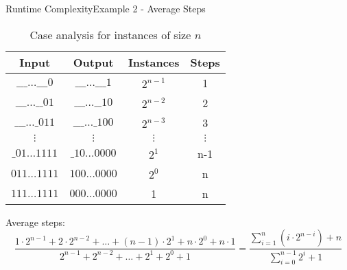 \begin{frame}{Runtime Complexity}{Example 2 - Average Steps}
  \vspace{-2.0em}
  \begin{table}[!h]%
    \caption{Case analysis for instances of size $n$}%
    \label{tab:runtime:binary_addition_case_analysis}%
    \vspace{-0.5em}%
    \begin{tabular}{cccc}
      Input & Output & Instances & Steps\\
      \midrule
      $\_\_\_ \ldots \_\_\_0$ & $\_\_\_ \ldots \_\_\_1$ &$2^{n-1}$ & 1\\
      $\_\_\_ \ldots \_\_01$ & $\_\_\_ \ldots \_\_10$ & $2^{n-2}$ & 2\\
      $\_\_\_ \ldots \_011$ & $\_\_\_ \ldots \_100$ & $2^{n-3}$ & 3\\
      $\vdots$ & $\vdots$ & $\vdots$ & $\vdots$\\
      $\_01 \ldots 1111$ & $\_10 \ldots 0000$ & $2^{1}$ & n-1\\
      $011 \ldots 1111$ & $100 \ldots 0000$ & $2^0$ & n\\
      $111 \ldots 1111$ & $000 \ldots 0000$ & 1 & n\\
    \end{tabular}
  \end{table}
  \vspace{-0.5em}
  {\color{Mittel-Blau}Average steps}:
  \vspace{-1.0em}
  \begin{displaymath}
    \dfrac{
      1 \cdot 2^{n-1} + 2 \cdot 2^{n-2}+\dots+
      (n-1) \cdot 2^1 + n \cdot 2^0 + n \cdot 1
    }{2^{n-1}+2^{n-2}+\dots+2^{1}+2^{0}+1}
    = \frac{
      \sum\limits_{i=1}^n \left(i \cdot 2^{n-i}\right) + n
    }{
      \sum\limits_{i=0}^{n-1} 2^i + 1
    }
  \end{displaymath}
\end{frame}


